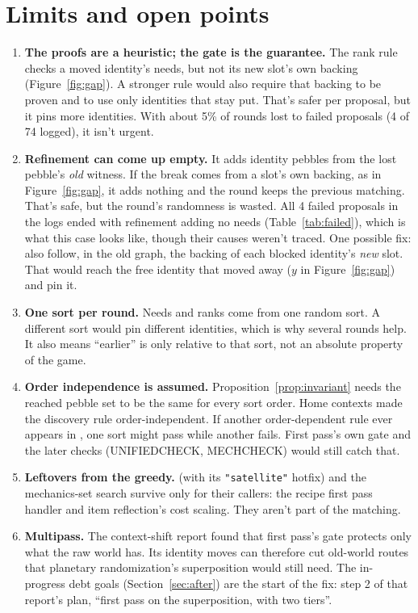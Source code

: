 \section{Limits and open points}
\label{sec:limits}

\begin{enumerate}[leftmargin=*]
  \item \textbf{The proofs are a heuristic; the gate is the guarantee.} The rank rule checks a moved identity's needs, but not its new slot's own backing (Figure~\ref{fig:gap}). A stronger rule would also require that backing to be proven and to use only identities that stay put. That's safer per proposal, but it pins more identities. With about 5\% of rounds lost to failed proposals (4 of 74 logged), it isn't urgent.
  \item \textbf{Refinement can come up empty.} It adds identity pebbles from the lost pebble's \emph{old} witness. If the break comes from a slot's own backing, as in Figure~\ref{fig:gap}, it adds nothing and the round keeps the previous matching. That's safe, but the round's randomness is wasted. All 4 failed proposals in the logs ended with refinement adding no needs (Table~\ref{tab:failed}), which is what this case looks like, though their causes weren't traced. One possible fix: also follow, in the old graph, the backing of each blocked identity's \emph{new} slot. That would reach the free identity that moved away ($y$ in Figure~\ref{fig:gap}) and pin it.
  \item \textbf{One sort per round.} Needs and ranks come from one random sort. A different sort would pin different identities, which is why several rounds help. It also means ``earlier'' is only relative to that sort, not an absolute property of the game.
  \item \textbf{Order independence is assumed.} Proposition~\ref{prop:invariant} needs the reached pebble set to be the same for every sort order. Home contexts made the discovery rule order-independent. If another order-dependent rule ever appears in , one sort might pass while another fails. First pass's own gate and the later checks (UNIFIEDCHECK, MECHCHECK) would still catch that.
  \item \textbf{Leftovers from the greedy.}  (with its \texttt{"satellite"} hotfix) and the mechanics-set search survive only for their callers: the recipe first pass handler and item reflection's cost scaling. They aren't part of the matching.
  \item \textbf{Multipass.} The context-shift report found that first pass's gate protects only what the raw world has. Its identity moves can therefore cut old-world routes that planetary randomization's superposition would still need. The in-progress debt goals (Section~\ref{sec:after}) are the start of the fix: step 2 of that report's plan, ``first pass on the superposition, with two tiers''.
\end{enumerate}
